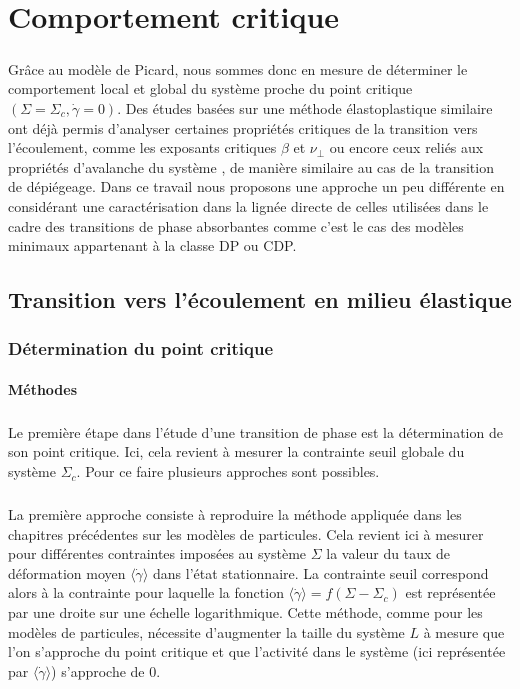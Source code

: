 \section{Comportement critique}

\subparagraph{}Grâce au modèle de Picard, nous sommes donc en mesure de déterminer le comportement local et global du système proche du point critique $(\Sigma = \Sigma_c, \dot{\gamma} = 0)$. Des études basées sur une méthode élastoplastique similaire ont déjà permis d'analyser certaines propriétés critiques de la transition vers l'écoulement, comme les exposants critiques $\beta$ \cite{lin_scaling_2014, ferrero_criticality_2019, liu_driving_2016, jagla_different_2017} et $\nu_\perp$ \cite{lin_scaling_2014, korchinski_thermally_2024} ou encore ceux reliés aux propriétés d'avalanche du système \cite{liu_driving_2016, ferrero_criticality_2019, lin_scaling_2014, budrikis_universal_2017}, de manière similaire au cas de la transition de dépiégeage. Dans ce travail nous proposons une approche un peu différente en considérant une caractérisation dans la lignée directe de celles utilisées dans le cadre des transitions de phase absorbantes comme c'est le cas des modèles minimaux appartenant à la classe DP ou CDP.

\subsection{Transition vers l'écoulement en milieu élastique}

\subsubsection{Détermination du point critique}

\label{sec:methodepointcritique}

\paragraph{Méthodes}

\subparagraph{}Le première étape dans l'étude d'une transition de phase est la détermination de son point critique. Ici, cela revient à mesurer la contrainte seuil globale du système $\Sigma_c$. Pour ce faire plusieurs approches sont possibles.

\subparagraph{}La première approche consiste à reproduire la méthode appliquée dans les chapitres précédentes sur les modèles de particules. Cela revient ici à mesurer pour différentes contraintes imposées au système $\Sigma$ la valeur du taux de déformation moyen $\langle \dot{\gamma}\rangle$ dans l'état stationnaire. La contrainte seuil correspond alors à la contrainte pour laquelle la fonction $\langle \dot{\gamma} \rangle = f(\Sigma-\Sigma_c)$ est représentée par une droite sur une échelle logarithmique. Cette méthode, comme pour les modèles de particules, nécessite d'augmenter la taille du système $L$ à mesure que l'on s'approche du point critique et que l'activité dans le système (ici représentée par $\langle \dot{\gamma}\rangle$) s'approche de $0$.

